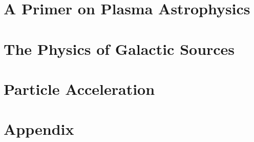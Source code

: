 \documentclass[letterpaper, 11pt, notitlepage]{report}
\begin{document}
\newpage

\tableofcontents\label{sec:contents}

%
%
%
\chapter{A Primer on Plasma Astrophysics}
%
%



\chapter{The Physics of Galactic Sources}
%
%

\newpage

\chapter{Particle Acceleration}
%
%
%
%
\newpage

%
%
%

\appendix

\newpage
\chapter{Appendix}
%
%
%
%
%
\newpage



\end{document}

